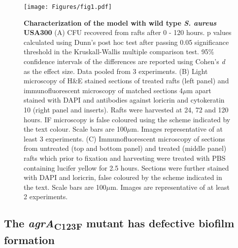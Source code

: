 \documentclass[10pt,letterpaper]{article}
\begin{document}
\begin{figure}[!ht]
\begin{adjustwidth}{-2.25in}{0in}
\texttt{[image: Figures/fig1.pdf]}
\caption[Characterization of the model with wild type \textit{S. aureus} USA300]{
	\textbf{Characterization of the model with wild type \textit{S. aureus} USA300}
	(A) CFU recovered from rafts after 0 - 120 hours. p values calculated using Dunn's post hoc test after passing 0.05 significance threshold in the Kruskall-Wallis multiple comparison test. 95\% confidence intervals of the differences are reported using Cohen's \textit{d} as the effect size. Data pooled from 3 experiments.
	(B) Light microscopy of H\&E stained sections of treated rafts (left panel) and immunofluorescent microscopy of matched sections 4$\mu$m apart stained with DAPI and antibodies against loricrin and cytokeratin 10 (right panel and inserts). Rafts were harvested at 24, 72 and 120 hours. IF microscopy is false coloured using the scheme indicated by the text colour. Scale bars are 100$\mu$m. Images representative of at least 3 experiments.
	(C) Immunofluorescent microscopy of sections from untreated (top and bottom panel) and treated (middle panel) rafts which prior to fixation and harvesting were treated with PBS containing lucifer yellow for 2.5 hours. Sections were further stained with DAPI and loricrin, false coloured by the scheme indicated in the text. Scale bars are 100$\mu$m. Images are representative of at least 2 experiments.}
    \label{fig1}
    \end{adjustwidth}
\end{figure}

\subsection*{The \textit{agrA}\textsubscript{C123F} mutant has defective biofilm formation}
\end{document}
